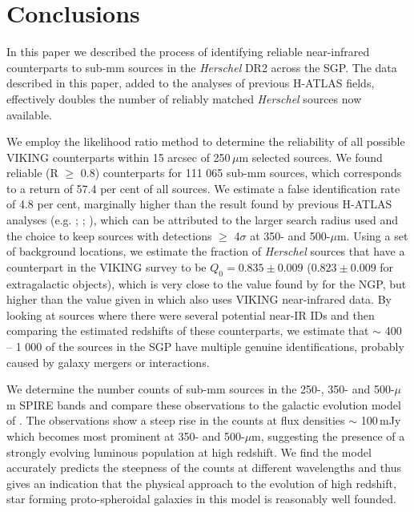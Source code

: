 \documentclass[fleqn,usenatbib]{mnras}
\begin{document}
\section{Conclusions}
\label{sec:conclusions}

In this paper we described the process of identifying reliable near-infrared counterparts to sub-mm sources in the \textit{Herschel} DR2 across the SGP. The data described in this paper, added to the analyses of previous H-ATLAS fields, effectively doubles the number of reliably matched \textit{Herschel} sources now available.

We employ the likelihood ratio method to determine the reliability of all possible VIKING counterparts within 15 arcsec of 250\,$\mu$m selected sources. We found reliable (R $\geq$ 0.8) counterparts for 111 065 sub-mm sources, which corresponds to a return of 57.4 per cent of all sources. We estimate a false identification rate of 4.8 per cent, marginally higher than the result found by previous H-ATLAS analyses (e.g. \citealt{Fleuren_2012}; \citealt{Bourne_2016}; \citealt{Furlanetto_2018}), which can be attributed to the larger search radius used and the choice to keep sources with detections $\geq$ 4$\sigma$ at 350- and 500-$\mu$m. Using a set of background locations, we estimate the fraction of \textit{Herschel} sources that have a counterpart in the VIKING survey to be $Q_0 = 0.835\pm0.009$ ($0.823\pm0.009$ for extragalactic objects), which is very close to the value found by \citealt{Furlanetto_2018} for the NGP, but higher than the value given in \citealt{Fleuren_2012} which also uses VIKING near-infrared data. By looking at sources where there were several potential near-IR IDs and then comparing the estimated redshifts of these counterparts, we estimate that $\sim$ 400 -- 1 000 of the sources in the SGP have multiple genuine identifications, probably caused by galaxy mergers or interactions.

We determine the number counts of sub-mm sources in the 250-, 350- and 500-$\mu$m SPIRE bands and compare these observations to the galactic evolution model of \citealt{Cai_2013}. The observations show a steep rise in the counts at flux densities $\sim$ 100\,mJy which becomes most prominent at 350- and 500-$\mu$m, suggesting the presence of a strongly evolving luminous population at high redshift. We find the \citealt{Cai_2013} model accurately predicts the steepness of the counts at different wavelengths and thus gives an indication that the physical approach to the evolution of high redshift, star forming proto-spheroidal galaxies in this model is reasonably well founded.
\end{document}
